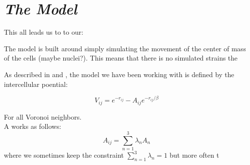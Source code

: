 \section{\textit{The Model}}
This all leads us to to our:


The model is built around simply simulating the movement of the center of mass of the cells (maybe nuclei?). This means that there is no simulated strains the


As described in \cite{} and \cite{}, the model we have been working with is defined by the intercellular poential:

\begin{equation}
    V_{ij}=e^{-r_{ij}}-A_{ij}e^{-r_{ij}/\beta}
\end{equation}

For all Voronoi neighbors.\\

A works as follows:
\begin{equation}
    A_{ij}=\sum_{n=1}^{3}\lambda_n A_n
\end{equation}
where we sometimes keep the constraint $\sum_{n=1}^{3}\lambda_n=1$ but more often t
